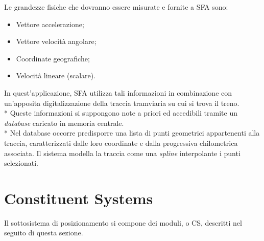 Le grandezze fisiche che dovranno essere misurate e fornite a SFA sono:
\begin{itemize}
	\item Vettore accelerazione;
	\item Vettore velocit\`a angolare;
	\item Coordinate geografiche;
	\item Velocit\`a lineare (scalare).
\end{itemize}
In quest'applicazione, SFA utilizza tali informazioni in combinazione con un'apposita digitalizzazione della traccia tramviaria su cui si trova il treno. \cite{sfaimugps}\cite{sfaimuodo}\cite{sfaimuodogps}\\*
Queste informazioni si suppongono note a priori ed accedibili tramite un \emph{database} caricato in memoria centrale. \cite{sqlite3}\\*
Nel database occorre predisporre una lista di punti geometrici appartenenti alla traccia, caratterizzati dalle loro coordinate e dalla progressiva chilometrica associata. Il sistema modella la traccia come una \emph{spline} interpolante i punti selezionati.
\section{Constituent Systems}
Il sottosistema di posizionamento si compone dei moduli, o CS, descritti nel seguito di questa sezione.
